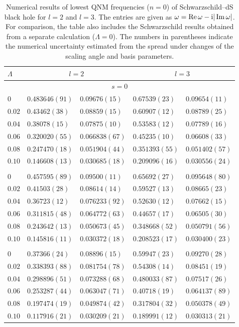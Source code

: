 \begin{table}[htbp]
\centering
\caption{Numerical results of lowest QNM frequencies ($n=0$) of Schwarzschild--dS black hole for $l=2$ and $l=3$.
The entries are given as
$\omega=\operatorname{Re}\omega-\mathrm{i}|\operatorname{Im}\omega|$.
For comparison, the table also includes the Schwarzschild results obtained
from a separate calculation ($\Lambda=0$).
The numbers in parentheses indicate the numerical uncertainty estimated from
the spread under changes of the scaling angle and basis parameters.}
\label{src:2605_03277:tab:result_ds}
\begin{tabular}{l
                l@{$-\rmi$}l
                l@{$-\rmi$}l}
\toprule
$\Lambda$ & \multicolumn{2}{c}{$l=2$} & \multicolumn{2}{c}{$l=3$} \\
\midrule 
\multicolumn{5}{c}{$s=0$} \\
$0$    & $0.483646(91)$     & $0.09676(15)$
       & $0.67539(23)$ & $0.09654(11)$ \\
$0.02$ & $0.43462(38)$ & $0.08859(15)$
       & $0.60907(12)$ & $0.08789(25)$ \\
$0.04$ & $0.38078(15)$ & $0.07875(10)$
       & $0.53583(12)$ & $0.07789(16)$ \\
$0.06$ & $0.320020(55)$ & $0.066838(67)$
       & $0.45235(10)$ & $0.06608(33)$ \\
$0.08$ & $0.247470(18)$ & $0.051904(44)$
       & $0.351393(55)$ & $0.051402(57)$ \\
$0.10$ & $0.146608(13)$ & $0.030685(18)$
       & $0.209096(16)$ & $0.030556(24)$ \\
\addlinespace
\multicolumn{5}{c}{$s=1$} \\
$0$    & $0.457595(89)$ & $0.09500(11)$
       & $0.65692(27)$ & $0.095648(80)$ \\
$0.02$ & $0.41503(28)$ & $0.08614(14)$
       & $0.59527(13)$ & $0.08665(23)$ \\
$0.04$ & $0.36723(12)$ & $0.076233(92)$
       & $0.52630(12)$ & $0.07662(15)$ \\
$0.06$ & $0.311815(48)$ & $0.064772(63)$
       & $0.44657(17)$ & $0.06505(30)$ \\
$0.08$ & $0.243642(13)$ & $0.050673(45)$
       & $0.348668(52)$ & $0.050791(56)$ \\
$0.10$ & $0.145816(11)$ & $0.030372(18)$
       & $0.208523(17)$ & $0.030400(23)$ \\
\addlinespace
\multicolumn{5}{c}{$s=2$} \\
$0$    & $0.37366(24)$ & $0.08896(15)$
       & $0.59947(23)$ & $0.09270(28)$ \\
$0.02$ & $0.338393(88)$ & $0.081754(78)$
       & $0.54308(14)$ & $0.08451(19)$ \\
$0.04$ & $0.298896(51)$ & $0.073288(68)$
       & $0.480033(87)$ & $0.07517(26)$ \\
$0.06$ & $0.253287(44)$ & $0.063047(71)$
       & $0.40718(19)$ & $0.064137(89)$ \\
$0.08$ & $0.197474(19)$ & $0.049874(42)$
       & $0.317804(32)$ & $0.050378(49)$ \\
$0.10$ & $0.117916(21)$ & $0.030209(21)$
       & $0.189991(12)$ & $0.030313(21)$ \\
\bottomrule
\end{tabular}
\end{table}
